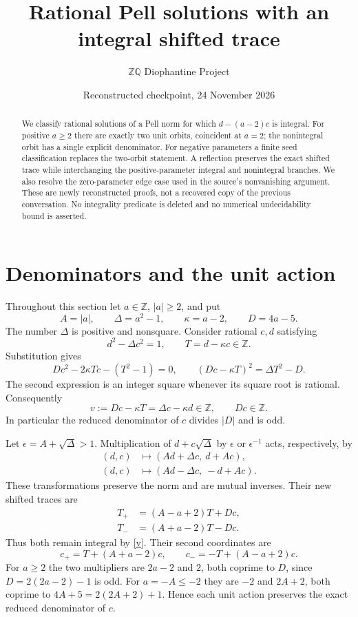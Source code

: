 \documentclass[11pt]{article}
\title{Rational Pell solutions with an integral shifted trace}
\author{\(\mathbb Z\mathbb Q\) Diophantine Project}
\date{Reconstructed checkpoint, 24 November 2026}
\newcommand{\Z}{\mathbb Z}\newcommand{\Q}{\mathbb Q}
\begin{document}
\maketitle
\begin{abstract}
We classify rational solutions of a Pell norm for which
\(d-(a-2)c\) is integral. For positive \(a\ge2\) there are exactly
two unit orbits, coincident at \(a=2\); the nonintegral orbit has a
single explicit denominator. For negative parameters a finite seed
classification replaces the two-orbit statement. A reflection preserves
the exact shifted trace while interchanging the positive-parameter
integral and nonintegral branches. We also resolve the zero-parameter
edge case used in the source's nonvanishing argument. These are newly
reconstructed proofs, not a recovered copy of the previous conversation.
No integrality predicate is deleted and no numerical undecidability
bound is asserted.
\end{abstract}

\section{Denominators and the unit action}

Throughout this section let \(a\in\Z\), \(|a|\ge2\), and put
\[
 A=|a|,\qquad \Delta=a^2-1,\qquad \kappa=a-2,\qquad D=4a-5.
\]
The number \(\Delta\) is positive and nonsquare. Consider rational
\(c,d\) satisfying
\begin{equation}\label{system}
 d^2-\Delta c^2=1,\qquad T=d-\kappa c\in\Z.
\end{equation}
Substitution gives
\begin{equation}\label{quadratic}
 Dc^2-2\kappa Tc-(T^2-1)=0,
 \qquad (Dc-\kappa T)^2=\Delta T^2-D.
\end{equation}
The second expression is an integer square whenever its square root
is rational. Consequently
\begin{equation}\label{v}
 v:=Dc-\kappa T=\Delta c-\kappa d\in\Z,\qquad Dc\in\Z.
\end{equation}
In particular the reduced denominator of \(c\) divides \(|D|\)
and is odd.

Let \(\epsilon=A+\sqrt\Delta>1\). Multiplication of
\(d+c\sqrt\Delta\) by \(\epsilon\) or \(\epsilon^{-1}\)
acts, respectively, by
\begin{align}
 (d,c)&\longmapsto(Ad+\Delta c,\ d+Ac),\label{forward}\\
 (d,c)&\longmapsto(Ad-\Delta c,\ -d+Ac).\label{backward}
\end{align}
These transformations preserve the norm and are mutual inverses.
Their new shifted traces are
\begin{align}
 T_+&=(A-a+2)T+Dc,\label{traceplus}\\
 T_-&=(A+a-2)T-Dc.\label{traceminus}
\end{align}
Thus both remain integral by \eqref{v}. Their second coordinates
are
\[
 c_+=T+(A+a-2)c,\qquad c_-=-T+(A-a+2)c.
\]
For \(a\ge2\) the two multipliers are \(2a-2\) and \(2\),
both coprime to \(D\), since \(D=2(2a-2)-1\) is odd.
For \(a=-A\le-2\) they are \(-2\) and \(2A+2\), both
coprime to \(4A+5=2(2A+2)+1\). Hence each unit action preserves
the exact reduced denominator of \(c\).
\end{document}
